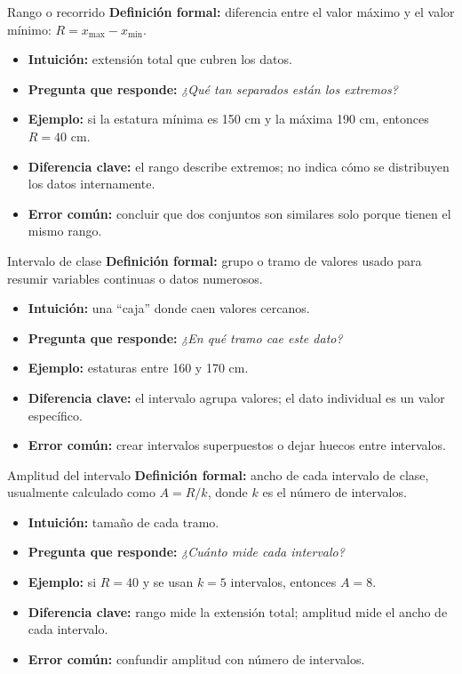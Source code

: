 \documentclass[aspectratio=169,11pt]{beamer}
\newcommand{\pregunta}[1]{\textbf{Pregunta que responde:} \emph{#1}}
\newcommand{\errorcomun}[1]{\textbf{Error común:} #1}
\newcommand{\diferencia}[1]{\textbf{Diferencia clave:} #1}
\begin{document}
\begin{frame}{Rango o recorrido}
\textbf{Definición formal:} diferencia entre el valor máximo y el valor mínimo: $R=x_{\max}-x_{\min}$.
\begin{itemize}
  \item \textbf{Intuición:} extensión total que cubren los datos.
  \item \pregunta{¿Qué tan separados están los extremos?}
  \item \textbf{Ejemplo:} si la estatura mínima es 150 cm y la máxima 190 cm, entonces $R=40$ cm.
  \item \diferencia{el rango describe extremos; no indica cómo se distribuyen los datos internamente.}
  \item \errorcomun{concluir que dos conjuntos son similares solo porque tienen el mismo rango.}
\end{itemize}
\end{frame}

\begin{frame}{Intervalo de clase}
\textbf{Definición formal:} grupo o tramo de valores usado para resumir variables continuas o datos numerosos.
\begin{itemize}
  \item \textbf{Intuición:} una ``caja'' donde caen valores cercanos.
  \item \pregunta{¿En qué tramo cae este dato?}
  \item \textbf{Ejemplo:} estaturas entre 160 y 170 cm.
  \item \diferencia{el intervalo agrupa valores; el dato individual es un valor específico.}
  \item \errorcomun{crear intervalos superpuestos o dejar huecos entre intervalos.}
\end{itemize}
\end{frame}

\begin{frame}{Amplitud del intervalo}
\textbf{Definición formal:} ancho de cada intervalo de clase, usualmente calculado como $A=R/k$, donde $k$ es el número de intervalos.
\begin{itemize}
  \item \textbf{Intuición:} tamaño de cada tramo.
  \item \pregunta{¿Cuánto mide cada intervalo?}
  \item \textbf{Ejemplo:} si $R=40$ y se usan $k=5$ intervalos, entonces $A=8$.
  \item \diferencia{rango mide la extensión total; amplitud mide el ancho de cada intervalo.}
  \item \errorcomun{confundir amplitud con número de intervalos.}
\end{itemize}
\end{frame}
\end{document}

